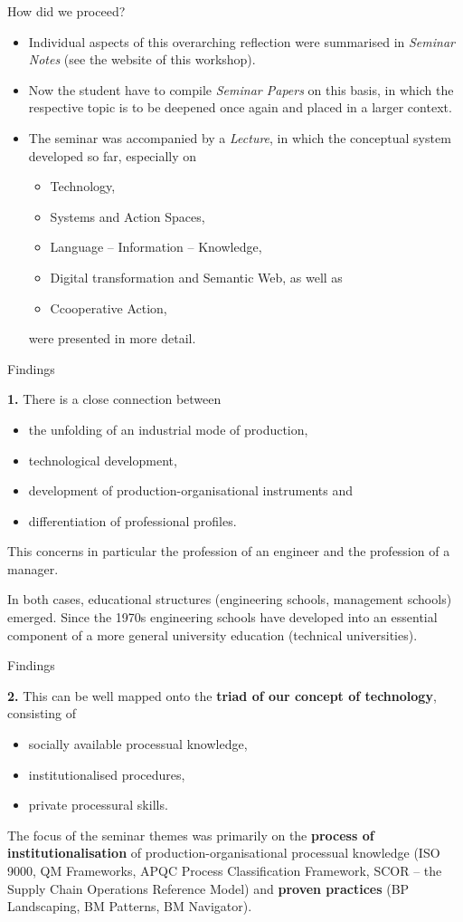 \documentclass{beamer}
\begin{document}
\begin{frame}{How did we proceed?} 
\begin{itemize}
\item Individual aspects of this overarching reflection were summarised in
  \emph{Seminar Notes} (see the website of this workshop).
\item Now the student have to compile \emph{Seminar Papers} on this basis, in
  which the respective topic is to be deepened once again and placed in a
  larger context.
\item The seminar was accompanied by a \emph{Lecture}, in which the conceptual
  system developed so far, especially on
  \begin{itemize}
  \item Technology, 
  \item Systems and Action Spaces,
  \item Language -- Information -- Knowledge, 
  \item Digital transformation and Semantic Web, as well as
  \item Ccooperative Action,
  \end{itemize}
  were presented in more detail.
\end{itemize}
\end{frame}
\begin{frame}{Findings}

\textbf{1.}
There is a close connection between 
\begin{itemize}
\item the unfolding of an industrial mode of production,
\item technological development,
\item development of production-organisational instruments and
\item differentiation of professional profiles.
\end{itemize}
This concerns in particular the profession of an engineer and the profession
of a manager.

In both cases, educational structures (engineering schools, management
schools) emerged. Since the 1970s engineering schools have developed into an
essential component of a more general university education (technical
universities).

\end{frame}
\begin{frame}{Findings}

\textbf{2.}
This can be well mapped onto the \textbf{triad of our concept of technology},
consisting of 
\begin{itemize}
\item socially available processual knowledge,
\item institutionalised procedures,
\item private processural skills. 
\end{itemize}
The focus of the seminar themes was primarily on the \textbf{process of
  institutionalisation} of production-organisational processual knowledge (ISO
9000, QM Frameworks, APQC Process Classification Framework, SCOR -- the Supply
Chain Operations Reference Model) and \textbf{proven practices} (BP
Landscaping, BM Patterns, BM Navigator).
\end{frame}
\end{document}
